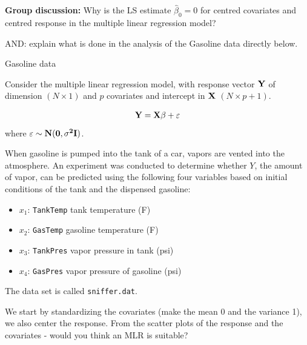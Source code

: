 \documentclass[
  ignorenonframetext,
]{beamer}
\providecommand{\tightlist}{%
  \setlength{\itemsep}{0pt}\setlength{\parskip}{0pt}}
\begin{document}
\begin{frame}

\textbf{Group discussion:} Why is the LS estimate \(\hat{\beta}_0=0\)
for centred covariates and centred response in the multiple linear
regression model?

AND: explain what is done in the analysis of the Gasoline data directly
below.

\end{frame}

\begin{frame}[fragile]

\begin{block}{Gasoline data}

Consider the multiple linear regression model, with response vector
\(\bf{Y}\) of dimension \((N \times 1)\) and \(p\) covariates and
intercept in \(\bf{X}\) \((N \times p+1)\).

\begin{align}
 \bf{Y} = \bf{X}\bf{\beta} + \bf{\varepsilon}
\end{align} where \(\bf{\varepsilon}\sim N(\bf{0},\sigma^2\bf{I})\).

When gasoline is pumped into the tank of a car, vapors are vented into
the atmosphere. An experiment was conducted to determine whether \(Y\),
the amount of vapor, can be predicted using the following four variables
based on initial conditions of the tank and the dispensed gasoline:

\begin{itemize}
\tightlist
\item
  \(x_1\): \texttt{TankTemp} tank temperature (F)
\item
  \(x_2\): \texttt{GasTemp} gasoline temperature (F)
\item
  \(x_3\): \texttt{TankPres} vapor pressure in tank (psi)
\item
  \(x_4\): \texttt{GasPres} vapor pressure of gasoline (psi)
\end{itemize}

The data set is called \texttt{sniffer.dat}.

We start by standardizing the covariates (make the mean 0 and the
variance 1), we also center the response. From the scatter plots of the
response and the covariates - would you think an MLR is suitable?

\end{block}

\end{frame}
\end{document}
